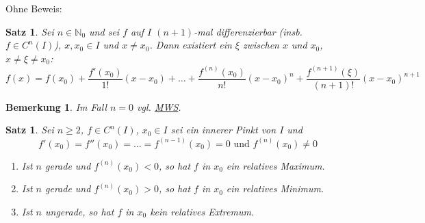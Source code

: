 \documentclass[titlepage,ngerman,a4paper,headsepline]{scrartcl}
\newcommand{\N}{\mathbb{N}}
\theoremstyle{named}
\theoremstyle{dotless}
\newtheorem{satz}[namedtheorem]{Satz}
\newtheorem*{bemerkung}{Bemerkung}
\begin{document}
Ohne Beweis:

\begin{satz} \label{9.20:satz-Taylor}
	Sei $n \in \N_{0}$ und sei $f$ auf $I$ $(n+1)$-mal differenzierbar (insb. $f \in C^{n}(I)$), $x, x_{0} \in I$ und $x \neq x_{0}$. Dann existiert ein $\xi$ zwischen $x$ und $x_{0}$, $x \neq \xi \neq x_{0}$:
		$$ f(x) = f(x_{0}) + \frac{f'(x_{0})}{1!} (x - x_{0}) + \dotsc + \frac{f^{(n)}(x_{0})}{n!} (x - x_{0})^{n} + \frac{f^{(n+1)}(\xi)}{(n+1)!} (x - x_{0})^{n+1} $$
\end{satz}

\begin{bemerkung}
	Im Fall $n = 0$ vgl. \hyperref[9.7:prop-Mittelwertsatz]{MWS}.	
\end{bemerkung}


\begin{satz} \label{9.21:satz}
	Sei $n \geq 2$, $f \in C^{n}(I)$, $x_{0} \in I$ sei ein innerer Pinkt von $I$ und
	$$ f'(x_{0}) = f''(x_{0}) = \dotsc = f^{(n-1)}(x_{0}) = 0 \text{ und } f^{(n)}(x_{0}) \neq 0 $$
	\begin{enumerate}
		\item Ist $n$ gerade und $f^{(n)}(x_{0}) < 0$, so hat $f$ in $x_{0}$ ein relatives Maximum.
		\item Ist $n$ gerade und $f^{(n)}(x_{0}) > 0$, so hat $f$ in $x_{0}$ ein relatives Minimum.
		\item Ist $n$ ungerade, so hat $f$ in $x_{0}$ kein relatives Extremum. 
	\end{enumerate}	
\end{satz}
\end{document}
